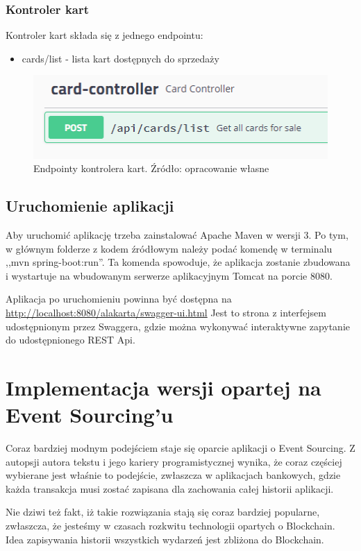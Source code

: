\subsubsection{Kontroler kart}
Kontroler kart składa się z jednego endpointu:
\begin{itemize}
    \item cards/list - lista kart dostępnych do sprzedaży
\end{itemize}
\begin{figure}[h!]
  \centering
    \includegraphics[width=1.0\textwidth]{images/card-controller.PNG}
  \caption{Endpointy kontrolera kart. Źródło: opracowanie własne }
\end{figure}
\FloatBarrier
\subsection{Uruchomienie aplikacji}
Aby uruchomić aplikację trzeba zainstalować Apache Maven w wersji 3.
Po tym, w głównym folderze z kodem źródłowym należy podać komendę w terminalu ,,mvn spring-boot:run''. Ta komenda spowoduje, że aplikacja zostanie zbudowana i wystartuje na wbudowanym serwerze aplikacyjnym Tomcat na porcie 8080.

Aplikacja po uruchomieniu powinna być dostępna na \url{http://localhost:8080/alakarta/swagger-ui.html}
Jest to strona z interfejsem udostępnionym przez Swaggera, gdzie można wykonywać interaktywne zapytanie do udostępnionego REST Api.


\section{Implementacja wersji opartej na Event Sourcing'u}
Coraz bardziej modnym podejściem staje się oparcie aplikacji o Event Sourcing. Z autopsji autora tekstu i jego kariery programistycznej wynika, że coraz częściej wybierane jest właśnie to podejście, zwłaszcza w aplikacjach bankowych, gdzie każda transakcja musi zostać zapisana dla zachowania całej historii aplikacji. 

Nie dziwi też fakt, iż takie rozwiązania stają się coraz bardziej popularne, zwłaszcza, że jesteśmy w czasach rozkwitu technologii opartych o Blockchain. Idea zapisywania historii wszystkich wydarzeń jest zbliżona do Blockchain.

